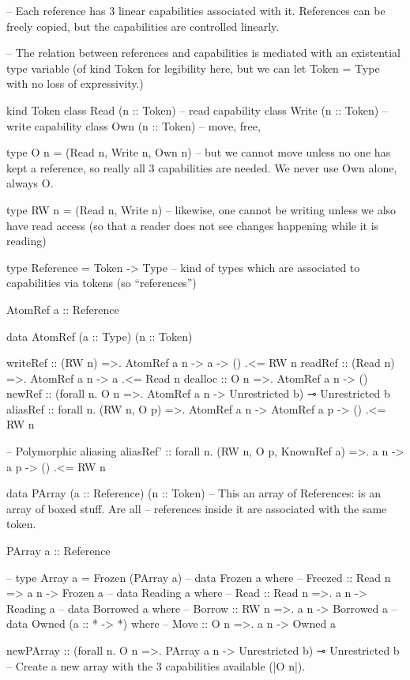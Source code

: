 \begin{spec}
-- Each reference has 3 linear capabilities associated with it. References can be freely copied, but the capabilities are controlled linearly.

-- The relation between references and capabilities is mediated with an existential type variable (of kind Token for legibility here, but we can let Token = Type with no loss of expressivity.)

kind Token
class Read (n :: Token)    -- read capability
class Write (n :: Token)   -- write capability
class Own (n :: Token)     -- move, free,

type O n = (Read n, Write n, Own n) -- but we cannot move unless no one has kept a reference, so really all 3 capabilities are needed. We never use Own alone, always O.

type RW n = (Read n, Write n) -- likewise, one cannot be writing unless we also have read access (so that a reader does not see changes happening while it is reading)

type Reference = Token -> Type -- kind of types which are associated to capabilities via tokens (so ``references'')

AtomRef a :: Reference

data AtomRef (a :: Type) (n :: Token)

writeRef :: (RW n) =>. AtomRef a n -> a -> () .<= RW n
readRef :: (Read n) =>. AtomRef a n -> a .<= Read n
dealloc :: O n =>. AtomRef a n -> ()
newRef :: (forall n. O n =>. AtomRef a n -> Unrestricted b) ⊸ Unrestricted b
aliasRef :: forall n. (RW n, O p) =>. AtomRef a n -> AtomRef a p -> () .<= RW n

-- Polymorphic aliasing
aliasRef' :: forall n. (RW n, O p, KnownRef a) =>. a n -> a p -> () .<= RW n


data PArray (a :: Reference) (n :: Token)
  -- This an array of References: is an array of boxed stuff. Are all
  -- references inside it are associated with the same token.

PArray a :: Reference

-- type Array a = Frozen (PArray a)
-- data Frozen a where
--   Freezed :: Read n => a n -> Frozen a
-- data Reading a where
--   Read :: Read n =>. a n -> Reading a
-- data Borrowed a where
--   Borrow :: RW n =>. a n -> Borrowed a
-- data Owned (a :: * -> *) where
--   Move :: O n =>. a n -> Owned a

newPArray    :: (forall n. O n =>. PArray a n -> Unrestricted b) ⊸ Unrestricted b
-- Create a new array with the 3 capabilities available (|O n|).


\end{spec}
